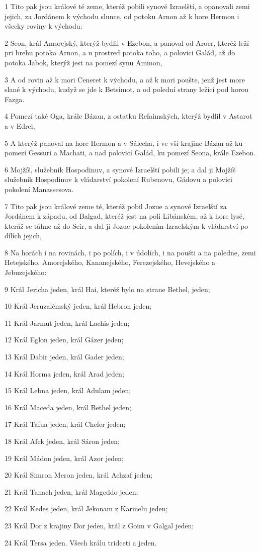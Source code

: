 \par 1 Tito pak jsou králové té zeme, kteréž pobili synové Izraelští, a opanovali zemi jejich, za Jordánem k východu slunce, od potoku Arnon až k hore Hermon i všecky roviny k východu:
\par 2 Seon, král Amorejský, kterýž bydlil v Ezebon, a panoval od Aroer, kteréž leží pri brehu potoka Arnon, a u prostred potoka toho, a polovici Galád, až do potoka Jabok, kterýž jest na pomezí synu Ammon,
\par 3 A od rovin až k mori Ceneret k východu, a až k mori poušte, jenž jest more slané k východu, kudyž se jde k Betsimot, a od polední strany ležící pod horou Fazga.
\par 4 Pomezí také Oga, krále Bázan, z ostatku Refaimských, kterýž bydlil v Astarot a v Edrei,
\par 5 A kterýž panoval na hore Hermon a v Sálecha, i ve vší krajine Bázan až ku pomezí Gessuri a Machati, a nad polovicí Galád, ku pomezí Seona, krále Ezebon.
\par 6 Mojžíš, služebník Hospodinuv, a synové Izraelští pobili je; a dal ji Mojžíš služebník Hospodinuv k vládarství pokolení Rubenovu, Gádovu a polovici pokolení Manassesova.
\par 7 Tito pak jsou králové zeme té, kteréž pobil Jozue a synové Izraelští za Jordánem k západu, od Balgad, kteréž jest na poli Libánském, až k hore lysé, kteráž se táhne až do Seir, a dal ji Jozue pokolením Izraelským k vládarství po dílích jejich,
\par 8 Na horách i na rovinách, i po polích, i v údolích, i na poušti a na poledne, zemi Hetejského, Amorejského, Kananejského, Ferezejského, Hevejského a Jebuzejského:
\par 9 Král Jericha jeden, král Hai, kteréž bylo na strane Bethel, jeden;
\par 10 Král Jeruzalémský jeden, král Hebron jeden;
\par 11 Král Jarmut jeden, král Lachis jeden;
\par 12 Král Eglon jeden, král Gázer jeden;
\par 13 Král Dabir jeden, král Gader jeden;
\par 14 Král Horma jeden, král Arad jeden;
\par 15 Král Lebna jeden, král Adulam jeden;
\par 16 Král Maceda jeden, král Bethel jeden;
\par 17 Král Tafua jeden, král Chefer jeden;
\par 18 Král Afek jeden, král Sáron jeden;
\par 19 Král Mádon jeden, král Azor jeden;
\par 20 Král Simron Meron jeden, král Achzaf jeden;
\par 21 Král Tanach jeden, král Mageddo jeden;
\par 22 Král Kedes jeden, král Jekonam z Karmelu jeden;
\par 23 Král Dor z krajiny Dor jeden, král z Goim v Galgal jeden;
\par 24 Král Tersa jeden. Všech králu tridceti a jeden.

